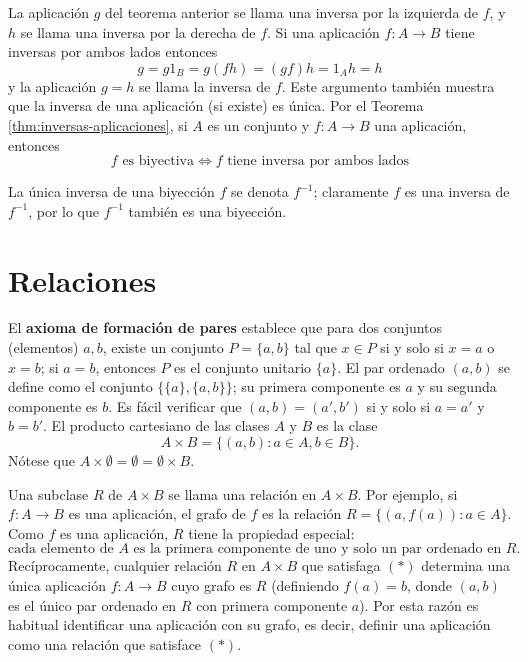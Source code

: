 La aplicación \( g \) del teorema anterior se llama una {inversa por la izquierda} de \( f \), y \( h \) se llama una {inversa por la derecha} de \( f \). Si una aplicación \( f: A \to B \) tiene inversas por ambos lados entonces
\[
g = g1_B = g(fh) = (gf)h = 1_A h = h
\]
y la aplicación \( g = h \) se llama la {inversa} de \( f \). Este argumento también muestra que la inversa de una aplicación (si existe) es única. Por el Teorema \ref{thm:inversas-aplicaciones}, si \( A \) es un conjunto y \( f: A \to B \) una aplicación, entonces
\[
f \text{ es biyectiva} \iff f \text{ tiene inversa por ambos lados}
\]

La única inversa de una biyección \( f \) se denota \( f^{-1} \); claramente \( f \) es una inversa de \( f^{-1} \), por lo que \( f^{-1} \) también es una biyección.


\section{Relaciones}

El \textbf{axioma de formación de pares} establece que para dos conjuntos (elementos) \( a, b \), existe un conjunto \( P = \{a, b\} \) tal que \( x \in P \) si y solo si \( x = a \) o \( x = b \); si \( a = b \), entonces \( P \) es el {conjunto unitario} \( \{a\} \). El {par ordenado} \( (a, b) \) se define como el conjunto \( \{\{a\}, \{a, b\}\} \); su {primera componente} es \( a \) y su {segunda componente} es \( b \). Es fácil verificar que \( (a, b) = (a', b') \) si y solo si \( a = a' \) y \( b = b' \). El {producto cartesiano} de las clases \( A \) y \( B \) es la clase
\[
A \times B = \{(a, b) : a \in A, b \in B\}.
\]
Nótese que \( A \times \emptyset = \emptyset = \emptyset \times B \).

Una subclase \( R \) de \( A \times B \) se llama una {relación} en \( A \times B \). Por ejemplo, si \( f: A \to B \) es una aplicación, el grafo de \( f \) es la relación \( R = \{(a, f(a)) : a \in A\} \). Como \( f \) es una aplicación, \( R \) tiene la propiedad especial:
\[
\text{cada elemento de } A \text{ es la primera componente de uno y solo un par ordenado en } R. \tag{$*$}
\]
Recíprocamente, cualquier relación \( R \) en \( A \times B \) que satisfaga $(*)$ determina una única aplicación \( f: A \to B \) cuyo grafo es \( R \) (definiendo \( f(a) = b \), donde \( (a, b) \) es el único par ordenado en \( R \) con primera componente \( a \)). Por esta razón es habitual identificar una aplicación con su grafo, es decir, definir una aplicación como una relación que satisface $(*)$.

